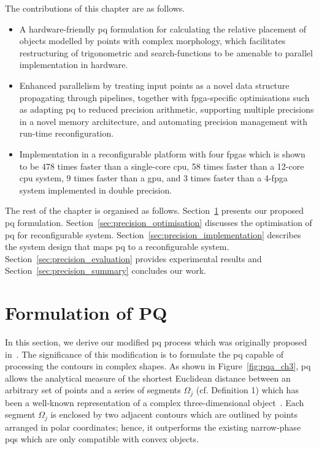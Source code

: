 The contributions of this chapter are as follows.
\begin{itemize}
\item A hardware-friendly \gls{pq} formulation for calculating the relative placement of objects modelled by points with complex morphology, which facilitates
restructuring of trigonometric and search-functions to be amenable to parallel implementation in hardware.
\item Enhanced parallelism by treating input points as a novel data structure propagating through pipelines, 
together with \gls{fpga}-specific optimisations such as adapting \gls{pq} to reduced precision arithmetic,
supporting multiple precisions in a novel memory architecture, and automating precision management with run-time reconfiguration.
\item Implementation in a reconfigurable platform with four \gls{fpga}s which is shown to be 478 times faster than a single-core \gls{cpu}, 58 times faster than a 12-core \gls{cpu} system, 9 times faster than a \gls{gpu}, and 3 times faster than a 4-\gls{fpga} system implemented in double precision.
\end{itemize}

The rest of the chapter is organised as follows.
Section~\ref{sec:precision_formulation} presents our proposed \gls{pq} formulation.
Section~\ref{sec:precision_optimisation} discusses the optimisation of \gls{pq} for reconfigurable system.
Section~\ref{sec:precision_implementation} describes the system design that maps \gls{pq} to a reconfigurable system.
Section~\ref{sec:precision_evaluation} provides experimental results and
Section~\ref{sec:precision_summary} concludes our work.

\section{Formulation of PQ}
\label{sec:precision_formulation}

In this section, we derive our modified \gls{pq} process which was originally proposed in~\cite{kwok13}. 
The significance of this modification is to formulate the \gls{pq} capable of processing the contours in complex shapes. 
As shown in Figure~\ref{fig:pqa_ch3}, \gls{pq} allows the analytical measure of the shortest Euclidean distance between an arbitrary set of points and a series of segments $\Omega_j$ (cf. Definition 1) which has been a well-known representation of a complex three-dimensional object~\cite{ponce89}. 
Each segment $\Omega_j$ is enclosed by two adjacent contours which are outlined by points arranged in polar coordinates; 
hence, it outperforms the existing narrow-phase \gls{pq}s which are only compatible with convex objects.

